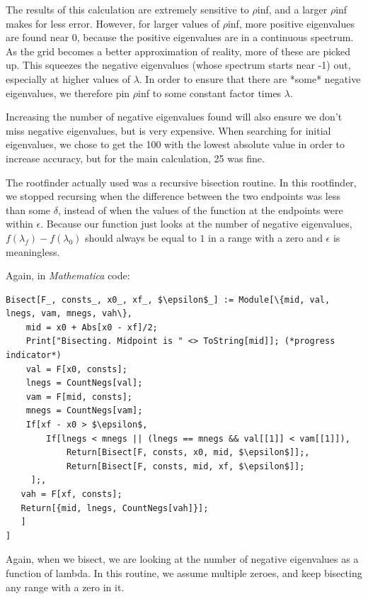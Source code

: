 \documentclass[12pt,twoside]{reedthesis}
\begin{document}
The results of this calculation are extremely sensitive to $\rho$inf, and a larger $\rho$inf makes for less error. However, for larger values of $\rho$inf, more positive eigenvalues are found near 0, because the positive eigenvalues are in a continuous spectrum. As the grid becomes a better approximation of reality, more of these are picked up. This squeezes the negative eigenvalues (whose spectrum starts near -1) out, especially at higher values of $\lambda$. In order to ensure that there are *some* negative eigenvalues, we therefore pin $\rho$inf to some constant factor times $\lambda$. 

Increasing the number of negative eigenvalues found will also ensure we don't miss negative eigenvalues, but is very expensive. When searching for initial eigenvalues, we chose to get the 100 with the lowest absolute value in order to increase accuracy, but for the main calculation, 25 was fine.

The rootfinder actually used was a recursive bisection routine. In this rootfinder, we stopped recursing when the difference between the two endpoints was less than some $\delta$, instead of when the values of the function at the endpoints were within $\epsilon$. Because our function just looks at the number of negative eigenvalues, $f(\lambda_f) - f(\lambda_0)$ should always be equal to $1$ in a range with a zero and $\epsilon$ is meaningless. 

Again, in \emph{Mathematica} code:

\begin{Verbatim}[commandchars=\\\{\}, codes={\catcode`$=3}]
Bisect[F_, consts_, x0_, xf_, $\epsilon$_] := Module[\{mid, val, lnegs, vam, mnegs, vah\},
    mid = x0 + Abs[x0 - xf]/2;
    Print["Bisecting. Midpoint is " <> ToString[mid]]; (*progress indicator*)
    val = F[x0, consts];
    lnegs = CountNegs[val];
    vam = F[mid, consts];
    mnegs = CountNegs[vam];
    If[xf - x0 > $\epsilon$,
        If[lnegs < mnegs || (lnegs == mnegs && val[[1]] < vam[[1]]), 
            Return[Bisect[F, consts, x0, mid, $\epsilon$]];, 
            Return[Bisect[F, consts, mid, xf, $\epsilon$]]; 
     ];,
   vah = F[xf, consts];
   Return[{mid, lnegs, CountNegs[vah]}];
   ]
]
\end{Verbatim}

Again, when we bisect, we are looking at the number of negative eigenvalues as a function of lambda. In this routine, we assume multiple zeroes, and keep bisecting any range with a zero in it.
\end{document}
